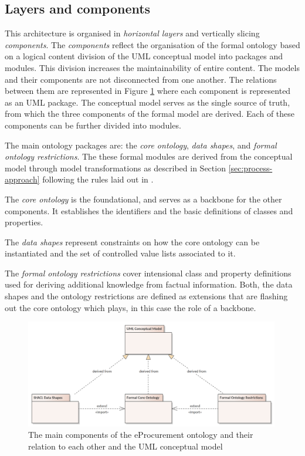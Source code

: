 	

	
	\subsection{Layers and components}
	\label{sec:layers-components}
	
	This architecture is organised in \textit{horizontal layers} and vertically slicing \textit{components}. The \textit{components} reflect the organisation of the formal ontology based on a logical content division of the UML conceptual model into packages and modules. This division increases the maintainability of entire content. The models and their components are not disconnected from one another. The relations between them are represented in Figure \ref{fig:components} where each component is represented as an UML package. The conceptual model serves as the single source of truth, from which the three components of the formal model are derived. Each of these components can be further divided into modules. 
	
	The main ontology packages are: the \textit{core ontology}, \textit{data shapes}, and \textit{formal ontology restrictions}. The these formal modules are derived from the conceptual model through model transformations as described in Section \ref{sec:process-approach} following the rules laid out in \citet{costetchi2020c}.
	
	The \textit{core ontology} is the foundational, and serves as a backbone for the other components. It establishes the identifiers and the basic definitions of classes and properties.
	 	
	The \textit{data shapes} represent constraints on how the core ontology can be instantiated and the set of controlled value lists associated to it. 	
	
	The \textit{formal ontology restrictions} cover intensional class and property definitions used for deriving additional knowledge from factual information. Both, the data shapes and the ontology restrictions are defined as extensions that are flashing out the core ontology which plays, in this case the role of a backbone.
	
	\begin{figure}[!ht]
		\centering
		\includegraphics[width=0.99\textwidth]{../img/uml.png}
		\caption{The main components of the eProcurement ontology and their relation to each other and the UML conceptual model}
		\label{fig:components}
	\end{figure}
	
